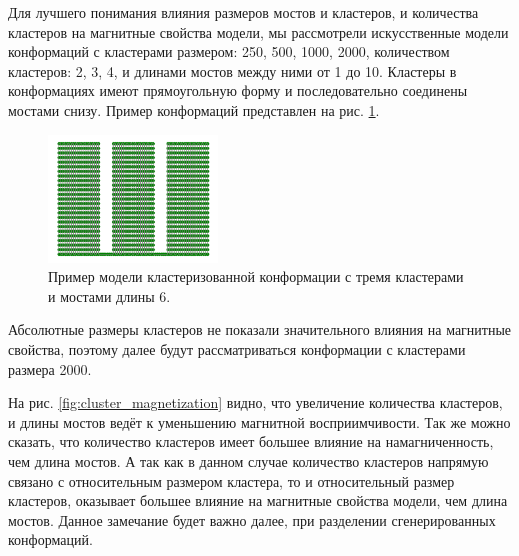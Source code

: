 Для лучшего понимания влияния размеров мостов и кластеров, и количества кластеров на магнитные свойства модели, мы рассмотрели искусственные модели конформаций с кластерами размером: 250, 500, 1000, 2000, количеством кластеров: 2, 3, 4, и длинами мостов между ними от 1 до 10. Кластеры в конформациях имеют прямоугольную форму и последовательно соединены мостами снизу. Пример конформаций представлен на рис. \ref{fig:cluster_conf_example}.

\begin{figure}[ht]
	\centering
	\includegraphics*[width=0.4\textwidth]{../images/3Cluster_conformation_short.png}
	\caption{Пример модели кластеризованной конформации с тремя кластерами и мостами длины 6.}
	\label{fig:cluster_conf_example}
\end{figure}

Абсолютные размеры кластеров не показали значительного влияния на магнитные свойства, поэтому далее будут рассматриваться конформации с кластерами размера 2000.

На рис. \ref{fig:cluster_magnetization} видно, что увеличение количества кластеров, и длины мостов ведёт к уменьшению магнитной восприимчивости. Так же можно сказать, что количество кластеров имеет большее влияние на намагниченность, чем длина мостов. А так как в данном случае количество кластеров напрямую связано с относительным размером кластера, то и относительный размер кластеров, оказывает большее влияние на магнитные свойства модели, чем длина мостов. Данное замечание будет важно далее, при разделении сгенерированных конформаций.

